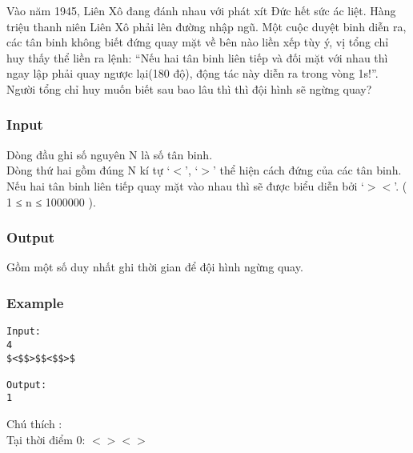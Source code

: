 



   Vào năm 1945, Liên Xô đang đánh nhau với phát xít Đức hết sức ác liệt. Hàng triệu thanh niên Liên Xô phải lên đường nhập ngũ. Một cuộc duyệt binh diễn ra, các tân binh không biết đứng quay mặt về bên nào liền xếp tùy ý, vị tổng chỉ huy thấy thể liền ra lệnh: “Nếu hai tân binh liên tiếp và đối mặt với nhau thì ngay lập phải quay ngược lại(180 độ), động tác này diễn ra trong vòng 1s!”. Người tổng chỉ huy muốn biết sau bao lâu thì thì đội hình sẽ ngừng quay?  

\subsubsection{   Input  }

   Dòng đầu ghi số nguyên N là số tân binh.   
\\   Dòng thứ hai gồm đúng N kí tự ‘$<$’, ‘$>$’ thể hiện cách đứng của các tân binh. Nếu hai tân binh liên tiếp quay mặt vào nhau thì sẽ được biểu diễn bởi ‘$>$$<$’. ( 1 ≤ n ≤ 1000000 ).  

\subsubsection{   Output  }

   Gồm một số duy nhất ghi thời gian để đội hình ngừng quay.  

\subsubsection{   Example  }
\begin{verbatim}
Input:
4
$<$$>$$<$$>$

Output:
1
\end{verbatim}  Chú thích :  
\\  Tại thời điểm 0: $<$$>$$<$$>$  
\\